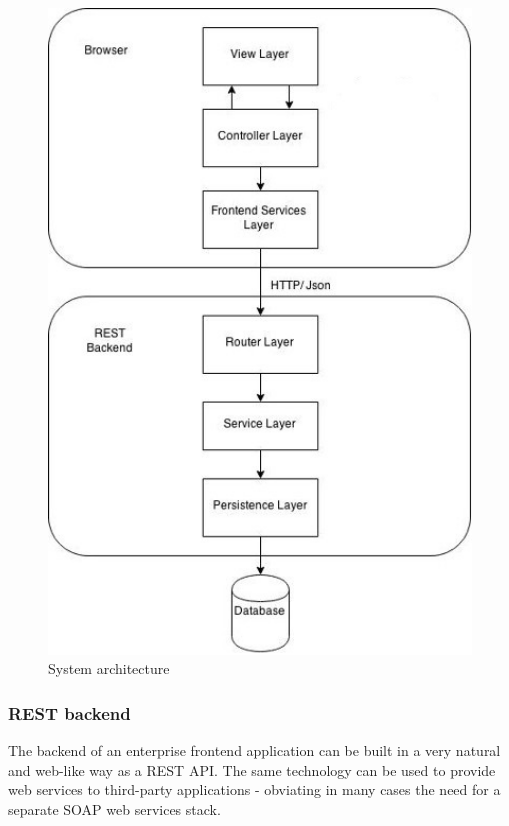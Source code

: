\documentclass[12pt,a4paper,titlepage]{article}
\begin{document}
\newpage
\begin{figure}[!ht] 
	\renewcommand\thefigure{2.5} %
	\centering 
	\includegraphics[width=15cm]{arch.jpg} 
	\caption{ System architecture }\label{fig}
	\end{figure}

\newpage
\subsubsection{REST backend}

The backend of an enterprise frontend application can be built in a very natural and web-like way as a REST API. The same technology can be used to provide web services to third-party applications - obviating in many cases the need for a separate SOAP web services stack.
\end{document}
